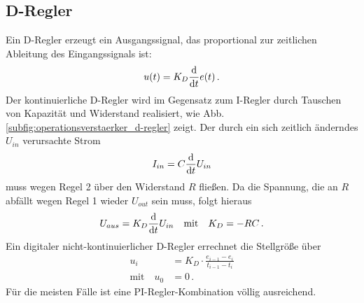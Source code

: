 \subsection{D-Regler}\label{d-regler}
Ein D-Regler erzeugt ein Ausgangssignal, das proportional zur zeitlichen
Ableitung des Eingangssignals ist:
\begin{equation}\label{eq:d-regler_01}
	u(t)=K_D\frac{\mathrm{d} }{\mathrm{d} t}e(t)\,.
\end{equation}
Der kontinuierliche D-Regler wird im Gegensatz zum I-Regler durch Tauschen von
Kapazität und Widerstand realisiert, wie Abb.
\ref{subfig:operationsverstaerker_d-regler} zeigt. Der durch ein sich zeitlich
änderndes $U_{in}$ verursachte Strom
\begin{equation}\label{eq:d-regler_02}
	I_{in}=C\frac{\mathrm{d} }{\mathrm{d} t}U_{in}
\end{equation}
muss wegen Regel 2 über den Widerstand $R$ fließen. Da die Spannung, die an $R$
abfällt wegen Regel 1 wieder $U_{out}$ sein muss, folgt hieraus
\begin{equation}\label{eq:d-regler_03}
	\begin{split}
		U_{aus}=K_D\frac{\mathrm{d} }{\mathrm{d} t}U_{in}
		\quad\text{mit}\quad
		K_D=-RC\,.
	\end{split}
\end{equation}
Ein digitaler nicht-kontinuierlicher D-Regler errechnet die Stellgröße über
\begin{equation}\label{eq:i-regler_03}
	\begin{split}
		u_i&=K_D\cdot\frac{e_{i-1}-e_i}{t_{i-1}-t_i}\\
		\text{mit}\quad
		u_{0}&=0\,.
	\end{split}
\end{equation}
Für die meisten Fälle ist eine PI-Regler-Kombination völlig ausreichend.

